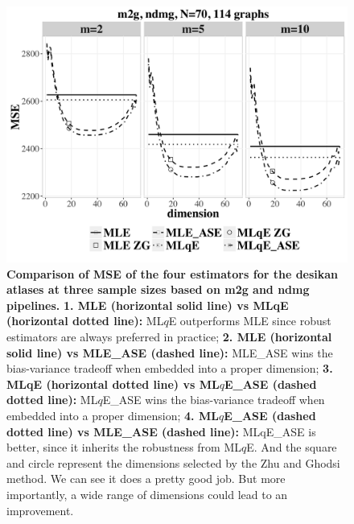 \documentclass[simplex.tex]{subfiles}
\begin{document}
\begin{figure}[h!]
\begin{cframed}
\centering
\includegraphics[width=\textwidth]{../../figs/CCI_m2g_ndmg_Weighted_q_0.9_EIG.png}
\caption{
{\bf Comparison of MSE of the four estimators for the desikan atlases at three sample sizes based on m2g and ndmg pipelines.}  
{\bf 1. MLE (horizontal solid line) vs MLqE (horizontal dotted line):} 
ML$q$E outperforms MLE since robust estimators are always preferred in practice;
{\bf 2. MLE (horizontal solid line) vs MLE\_ASE (dashed line):} MLE\_ASE wins the bias-variance tradeoff when embedded into a proper dimension; 
{\bf 3. MLqE (horizontal dotted line) vs ML$q$E\_ASE (dashed dotted line):}
ML$q$E\_ASE wins the bias-variance tradeoff when embedded into a proper dimension; 
{\bf 4.  ML$q$E\_ASE (dashed dotted line) vs MLE\_ASE (dashed
line):}
MLqE\_ASE is better, since it inherits the robustness from 
ML$q$E. And the square and circle represent the dimensions selected by the Zhu and Ghodsi method. We can see it does a pretty good job. But more importantly, a wide range of dimensions could lead to an improvement.
}
\label{fig:robDim}
\end{cframed}
\end{figure}
\clearpage
\end{document}
